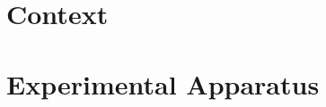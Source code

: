 \documentclass[oneside,12pt,final]{sty/ucthesis-CA2012}
\begin{document}
\begin{frontmatter}
	
	\maketitle
	\approvalpage
	\copyrightpage
	
	
	
	\tableofcontents
\end{frontmatter}

\begin{mainmatter}

\pagestyle{fancy}
\renewcommand{\chaptermark}[1]{\markboth{{\sf #1 \hspace*{\fill} Chapter~\thechapter}}{} }
\renewcommand{\sectionmark}[1]{\markright{ {\sf Section~\thesection \hspace*{\fill} #1 }}}
\fancyhf{}

\makeatletter \if@twoside \fancyhead[LO]{\small \rightmark} \fancyhead[RE]{\small\leftmark} \else \fancyhead[LO]{\small\leftmark}
\fancyhead[RE]{\small\rightmark} \fi

\def\cleardoublepage{\clearpage\if@openright \ifodd\c@page\else
  \hbox{}
  \vspace*{\fill}
  \begin{center}
    This page intentionally left blank
  \end{center}
  \vspace{\fill}
  \thispagestyle{plain}
  \newpage
  \fi \fi}
\makeatother
\fancyfoot[c]{\textrm{\textup{\thepage}}} %
\fancyfoot[C]{\thepage}
\renewcommand{\headrulewidth}{0.4pt}

 { \fancyhf{} \fancyfoot[C]{\thepage}
\renewcommand{\headrulewidth}{0pt}
\renewcommand{\footrulewidth}{0pt}}


\part{Context}


\part{Experimental Apparatus}






\end{mainmatter}
\end{document}
